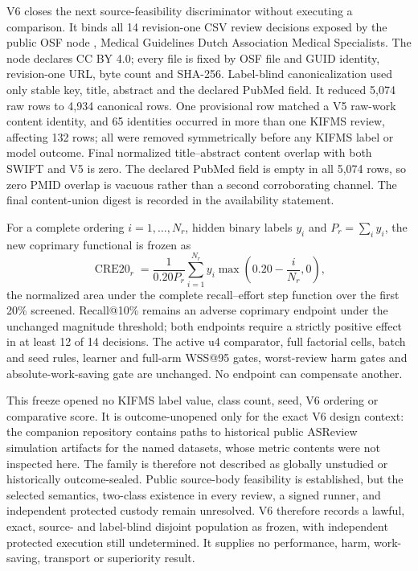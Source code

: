 V6 closes the next source-feasibility discriminator without executing a
comparison.  It binds all 14 revision-one CSV review decisions exposed by the
public OSF node , Medical Guidelines Dutch Association Medical
Specialists.  The node declares CC BY 4.0; every file is fixed by OSF file and
GUID identity, revision-one URL, byte count and SHA-256.  Label-blind
canonicalization used only stable key, title, abstract and the declared PubMed
field.  It reduced 5,074 raw rows to 4,934 canonical rows.  One provisional
row matched a V5 raw-work content identity, and 65 identities occurred in more
than one KIFMS review, affecting 132 rows; all were removed symmetrically before
any KIFMS label or model outcome.  Final normalized title--abstract content
overlap with both SWIFT and V5 is zero.  The declared PubMed field is empty in
all 5,074 rows, so zero PMID overlap is vacuous rather than a second
corroborating channel.  The final content-union digest is recorded in the availability statement.

For a complete ordering $i=1,\ldots,N_r$, hidden binary labels $y_i$ and
$P_r=\sum_i y_i$, the new coprimary functional is frozen as
\[
 \operatorname{CRE20}_r=
 \frac{1}{0.20P_r}\sum_{i=1}^{N_r}
 y_i\max\!\left(0.20-\frac{i}{N_r},0\right),
\]
the normalized area under the complete recall--effort step function over the
first 20\% screened.  Recall@10\% remains an adverse coprimary endpoint under
the unchanged magnitude threshold; both endpoints require a strictly positive
effect in at least 12 of 14 decisions.  The active u4 comparator, full
factorial cells, batch and seed rules, learner and full-arm WSS@95 gates,
worst-review harm gates and absolute-work-saving gate are unchanged.  No
endpoint can compensate another.

This freeze opened no KIFMS label value, class count, seed, V6 ordering or
comparative score.  It is outcome-unopened only for the exact V6 design
context: the companion repository contains paths to historical public ASReview
simulation artifacts for the named datasets, whose metric contents were not
inspected here.  The family is therefore not described as globally unstudied
or historically outcome-sealed.  Public source-body feasibility is established,
but the selected  semantics, two-class existence in every
review, a signed runner, and independent protected custody remain unresolved.
V6 therefore records a lawful, exact, source- and label-blind disjoint population as frozen, with independent protected execution still undetermined.
It supplies no performance, harm, work-saving, transport or superiority result.

